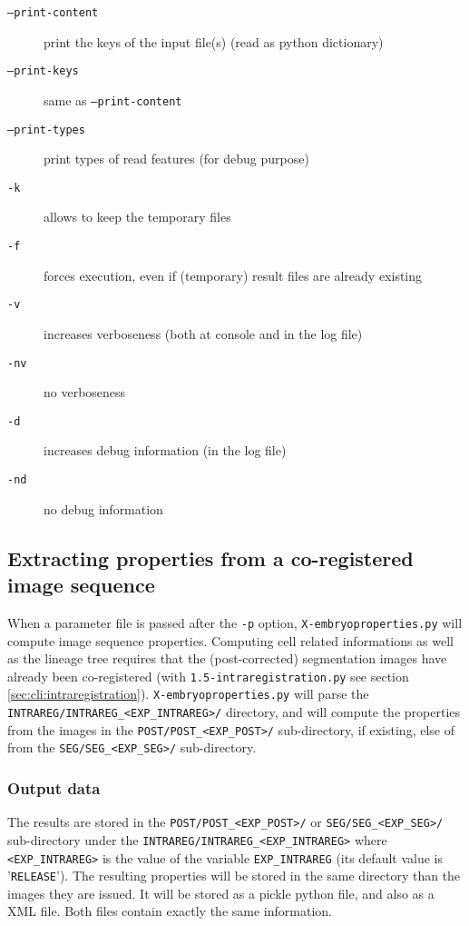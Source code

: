 \begin{description}
\item[\texttt{--print-content}] print the keys of the input file(s) (read as python dictionary)
\item[\texttt{--print-keys}] same as \texttt{--print-content}
\item[\texttt{--print-types}] print types of read features (for debug purpose)
\item[\texttt{-k}] allows to keep the temporary files
\item[\texttt{-f}] forces execution, even if (temporary) result files
  are already existing
\item[\texttt{-v}] increases verboseness (both at console and in the
  log file)
\item[\texttt{-nv}] no verboseness
\item[\texttt{-d}]  increases debug information (in the
  log file)
\item[\texttt{-nd}] no debug information
\end{description}

\subsection{Extracting properties from a co-registered image sequence}

When a parameter file is passed after the \texttt{-p} option, \texttt{X-embryoproperties.py} will compute image sequence properties.
Computing cell related informations as well as the lineage tree requires that the (post-corrected) segmentation images have already been co-registered (with \texttt{1.5-intraregistration.py} see section \ref{sec:cli:intraregistration}). 
\texttt{X-embryoproperties.py} will parse the \texttt{INTRAREG/INTRAREG\_<EXP\_INTRAREG>/} directory, and will compute the properties from the images in the \texttt{POST/POST\_<EXP\_POST>/} sub-directory, if existing, else of from the \texttt{SEG/SEG\_<EXP\_SEG>/} sub-directory.



\subsubsection{Output data}

The results are stored in the \texttt{POST/POST\_<EXP\_POST>/} or
\texttt{SEG/SEG\_<EXP\_SEG>/} sub-directory under the
\texttt{INTRAREG/INTRAREG\_<EXP\_INTRAREG>} where
\texttt{<EXP\_INTRAREG>} is the value of the variable
\texttt{EXP\_INTRAREG} (its default value is '\texttt{RELEASE}').  
The resulting properties will be stored in the same directory than the images they are issued. It will be stored as a pickle python file, and also as a XML file. Both files contain exactly the same information.

